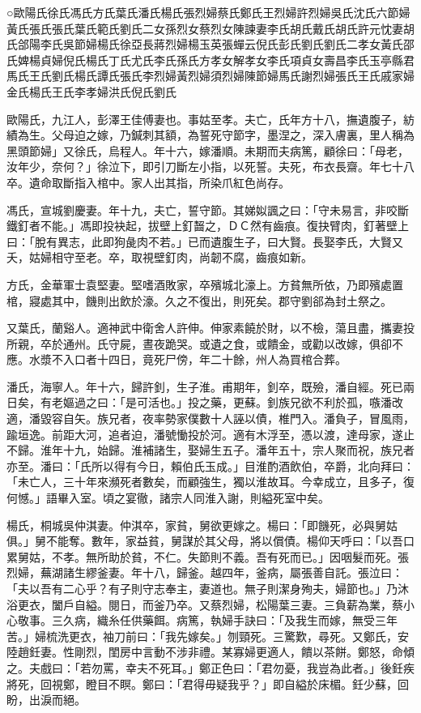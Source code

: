 
\begin{pinyinscope}
○歐陽氏徐氏馮氏方氏葉氏潘氏楊氏張烈婦蔡氏鄭氏王烈婦許烈婦吳氏沈氏六節婦黃氏張氏張氏葉氏範氏劉氏二女孫烈女蔡烈女陳諫妻李氏胡氏戴氏胡氏許元忱妻胡氏郃陽李氏吳節婦楊氏徐亞長蔣烈婦楊玉英張蟬云倪氏彭氏劉氏劉氏二孝女黃氏邵氏婢楊貞婦倪氏楊氏丁氏尤氏李氏孫氏方孝女解孝女李氏項貞女壽昌李氏玉亭縣君馬氏王氏劉氏楊氏譚氏張氏李烈婦黃烈婦須烈婦陳節婦馬氏謝烈婦張氏王氏戚家婦金氏楊氏王氏李孝婦洪氏倪氏劉氏

歐陽氏，九江人，彭澤王佳傅妻也。事姑至孝。夫亡，氏年方十八，撫遺腹子，紡績為生。父母迫之嫁，乃鍼刺其額，為誓死守節字，墨涅之，深入膚裏，里人稱為黑頭節婦」又徐氏，烏程人。年十六，嫁潘順。未期而夫病篤，顧徐曰：「母老，汝年少，奈何？」徐泣下，即引刀斷左小指，以死誓。夫死，布衣長齋。年七十八卒。遺命取斷指入棺中。家人出其指，所染爪紅色尚存。

馮氏，宣城劉慶妻。年十九，夫亡，誓守節。其娣姒諷之曰：「守未易言，非咬斷鐵釘者不能。」馮即投袂起，拔壁上釘齧之，ＤＣ然有齒痕。復抉臂肉，釘著壁上曰：「脫有異志，此即狗彘肉不若。」已而遺腹生子，曰大賢。長娶李氏，大賢又夭，姑婦相守至老。卒，取視壁釘肉，尚韌不腐，齒痕如新。

方氏，金華軍士袁堅妻。堅嗜酒敗家，卒殯城北濠上。方貧無所依，乃即殯處置棺，寢處其中，饑則出飲於濠。久之不復出，則死矣。郡守劉郤為封土祭之。

又葉氏，蘭谿人。適神武中衛舍人許伸。伸家素饒於財，以不檢，蕩且盡，攜妻投所親，卒於通州。氏守屍，晝夜跪哭。或遺之食，或饋金，或勸以改嫁，俱卻不應。水漿不入口者十四日，竟死尸傍，年二十餘，州人為買棺合葬。

潘氏，海寧人。年十六，歸許釗，生子淮。甫期年，釗卒，既殮，潘自經。死已兩日矣，有老嫗過之曰：「是可活也。」投之藥，更蘇。釗族兄欲不利於孤，嗾潘改適，潘毀容自矢。族兄者，夜率勢家僕數十人誣以債，椎門入。潘負子，冒風雨，踰垣逸。前距大河，追者迫，潘號慟投於河。適有木浮至，憑以渡，達母家，遂止不歸。淮年十九，始歸。淮補諸生，娶婦生五子。潘年五十，宗人聚而祝，族兄者亦至。潘曰：「氏所以得有今日，賴伯氏玉成。」目淮酌酒飲伯，卒爵，北向拜曰：「未亡人，三十年來瀕死者數矣，而顧強生，獨以淮故耳。今幸成立，且多子，復何憾。」語畢入室。頃之宴徹，諸宗人同淮入謝，則縊死室中矣。

楊氏，桐城吳仲淇妻。仲淇卒，家貧，舅欲更嫁之。楊曰：「即饑死，必與舅姑俱。」舅不能奪。數年，家益貧，舅謀於其父母，將以償債。楊仰天呼曰：「以吾口累舅姑，不孝。無所助於貧，不仁。失節則不義。吾有死而已。」因咽髮而死。張烈婦，蕪湖諸生繆釜妻。年十八，歸釜。越四年，釜病，屬張善自託。張泣曰：「夫以吾有二心乎？有子則守志奉主，妻道也。無子則潔身殉夫，婦節也。」乃沐浴更衣，闔戶自縊。閱日，而釜乃卒。又蔡烈婦，松陽葉三妻。三負薪為業，蔡小心敬事。三久病，織糸任供藥餌。病篤，執婦手訣曰：「及我生而嫁，無受三年苦。」婦梳洗更衣，袖刀前曰：「我先嫁矣。」刎頸死。三驚歎，尋死。又鄭氏，安陸趙鈓妻。性剛烈，閨房中言動不涉非禮。某寡婦更適人，饋以茶餅。鄭怒，命傾之。夫戲曰：「若勿罵，幸夫不死耳。」鄭正色曰：「君勿憂，我豈為此者。」後鈓疾將死，回視鄭，瞪目不瞑。鄭曰：「君得毋疑我乎？」即自縊於床楣。鈓少蘇，回盼，出淚而絕。


\end{pinyinscope}
